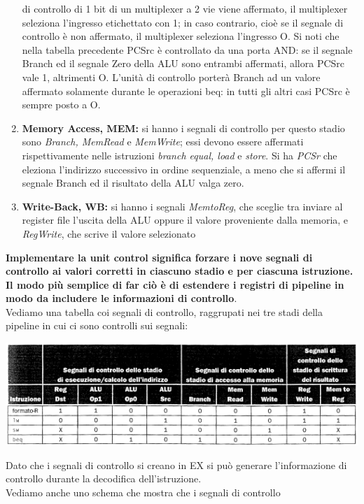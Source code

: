 \documentclass[a4paper,12pt, oneside]{book}
\begin{document}
\begin{enumerate}
{    di controllo di 1 bit di un multiplexer a 2 vie viene affermato, il
    multiplexer seleziona l'ingresso etichettato con 1; in caso contrario,
    cioè se il segnale di controllo è non affermato, il multiplexer
    seleziona l'ingresso O. Si noti che nella tabella precedente PCSrc
    è controllato da una porta AND: se il segnale Branch ed il segnale
    Zero della ALU sono entrambi affermati, allora PCSrc vale 1,
    altrimenti O. L'unità di controllo porterà Branch ad un valore
    affermato solamente durante le operazioni beq: in tutti gli
    altri casi PCSrc è sempre posto a O.}
  \item \textbf{Memory Access, MEM:} si hanno i segnali di controllo
  per questo stadio sono \textit{Branch, MemRead} e \textit{MemWrite};
  essi devono essere affermati rispettivamente nelle
  istruzioni\textit{ branch equal, load} e\textit{ store}. Si ha
  \textit{PCSr} che eleziona l'indirizzo successivo in ordine
  sequenziale, a meno che si affermi il segnale Branch
  ed il risultato della ALU valga zero.
  \item \textbf{Write-Back, WB:} si hanno i segnali \textit{MemtoReg},
  che sceglie tra inviare al register file l'uscita della ALU oppure
  il valore proveniente dalla memoria, e\textit{ RegWrite},
  che scrive il valore selezionato
\end{enumerate}
\textbf{Implementare la unit control significa forzare i nove segnali
  di controllo ai valori corretti in ciascuno stadio e per ciascuna
  istruzione. Il modo più semplice di far ciò è di estendere i
  registri di pipeline in modo da includere le informazioni di
  controllo}.\\
Vediamo una tabella coi segnali di controllo, raggrupati nei tre stadi
della pipeline in cui ci sono controlli sui segnali:
\begin{center}
  \includegraphics[scale = 0.7]{img/pipec4.png}
\end{center}
Dato che i segnali di controllo si creano in EX si può generare
l'informazione di controllo durante la decodifica dell'istruzione.\\
Vediamo anche uno schema che  mostra che i segnali di controllo
\end{document}
